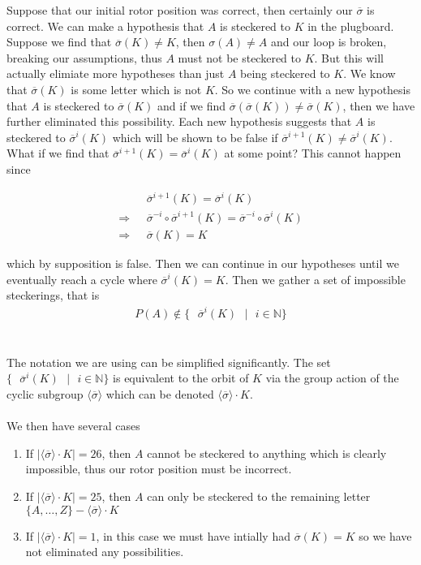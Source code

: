 Suppose that our initial rotor position was correct, then certainly our $\overline{\sigma}$ is correct. We can make a hypothesis 
that $A$ is steckered to $K$ in the plugboard. Suppose we find that $\overline{\sigma}(K) \ne K$, then $\sigma(A)\ne A$ and our loop is broken, breaking our assumptions, thus $A$ must not be steckered to $K$.
But this will actually elimiate more hypotheses than just $A$ being steckered to $K$. We know that $\overline{\sigma}(K)$ is some letter which is not $K$. So we continue with a new hypothesis that $A$ is steckered to 
$\overline{\sigma}(K)$ and if we find $\overline{\sigma}(\overline{\sigma}(K)) \ne \overline{\sigma}(K)$, then we have further eliminated this possibility. 
Each new hypothesis suggests that $A$ is steckered to $\overline{\sigma}^{i}(K)$ which will be shown to be false if $\overline{\sigma}^{i+1}(K) \ne \overline{\sigma}^{i}(K)$. What if we find that 
$\overline{\sigma}^{i+1}(K) = \overline{\sigma}^i(K)$ at some point? This cannot happen since 
\begin{center}
        \begin{align*}
            &\overline{\sigma}^{i+1}(K) = \overline{\sigma}^i(K)
            \\\Rightarrow \text{ }&\overline{\sigma}^{-i}\circ\overline{\sigma}^{i+1}(K) = \overline\sigma^{-i}\circ\overline{\sigma}^i(K)
            \\\Rightarrow \text{ }&\overline{\sigma}(K) = K
        \end{align*}
\end{center}
which by supposition is false. Then we can continue in our hypotheses until we eventually reach a cycle where $\overline\sigma^i(K) = K$.
Then we gather a set of impossible steckerings, that is
\begin{align*}
    P(A) \notin \{\text{ }\overline{\sigma}^i(K)\text{ }\vert\text{ }i\in\mathbb{N}\}
\end{align*}
\\\\The notation we are using can be simplified significantly. The set $\{\text{ }\overline{\sigma}^i(K)\text{ }\vert\text{ }i\in\mathbb{N}\}$ is equivalent to the orbit of $K$ via the group action of the 
cyclic subgroup $\langle\overline{\sigma}\rangle$ which can be denoted $\langle\overline{\sigma}\rangle\cdot K$. 
\\\\We then have several cases 
\begin{enumerate}
    \item If $|\langle\overline{\sigma}\rangle\cdot K| = 26$, then $A$ cannot be steckered to anything which is clearly
    impossible, thus our rotor position must be incorrect. 
    \item If $|\langle\overline{\sigma}\rangle\cdot K| = 25$, then $A$ can only be steckered to the remaining letter \\$\{A,\dots,Z\} -
    \langle \overline{\sigma} \rangle\cdot K$
    \item If $|\langle\overline{\sigma}\rangle\cdot K| = 1$, in this case we must have intially had $\overline{\sigma}(K) = K$ so we have not
    eliminated any possibilities. 
\end{enumerate}

